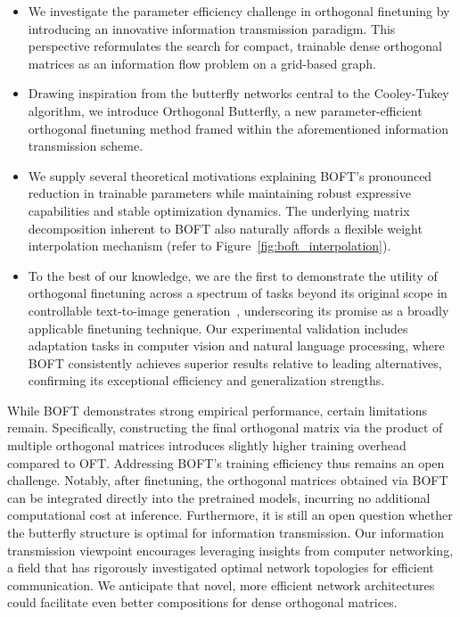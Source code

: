 \begin{itemize}[leftmargin=*,nosep]
    \item We investigate the parameter efficiency challenge in orthogonal finetuning by introducing an innovative information transmission paradigm. This perspective reformulates the search for compact, trainable dense orthogonal matrices as an information flow problem on a grid-based graph.
    \item Drawing inspiration from the butterfly networks central to the Cooley-Tukey algorithm, we introduce Orthogonal Butterfly, a new parameter-efficient orthogonal finetuning method framed within the aforementioned information transmission scheme.
    \item We supply several theoretical motivations explaining BOFT's pronounced reduction in trainable parameters while maintaining robust expressive capabilities and stable optimization dynamics. The underlying matrix decomposition inherent to BOFT also naturally affords a flexible weight interpolation mechanism (refer to Figure~\ref{fig:boft_interpolation}).
    \item To the best of our knowledge, we are the first to demonstrate the utility of orthogonal finetuning across a spectrum of tasks beyond its original scope in controllable text-to-image generation~\cite{qiu2023controlling}, underscoring its promise as a broadly applicable finetuning technique. Our experimental validation includes adaptation tasks in computer vision and natural language processing, where BOFT consistently achieves superior results relative to leading alternatives, confirming its exceptional efficiency and generalization strengths.
\end{itemize}

While BOFT demonstrates strong empirical performance, certain limitations remain. Specifically, constructing the final orthogonal matrix via the product of multiple orthogonal matrices introduces slightly higher training overhead compared to OFT. Addressing BOFT's training efficiency thus remains an open challenge. Notably, after finetuning, the orthogonal matrices obtained via BOFT can be integrated directly into the pretrained models, incurring no additional computational cost at inference. Furthermore, it is still an open question whether the butterfly structure is optimal for information transmission. Our information transmission viewpoint encourages leveraging insights from computer networking, a field that has rigorously investigated optimal network topologies for efficient communication. We anticipate that novel, more efficient network architectures could facilitate even better compositions for dense orthogonal matrices.

